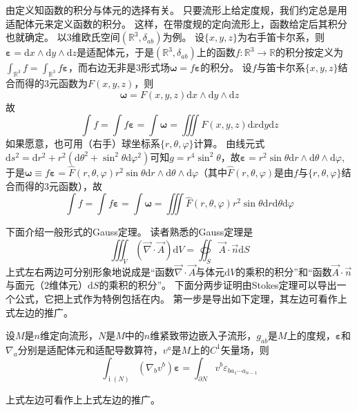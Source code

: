 由定义知函数的积分与体元的选择有关。
只要流形上给定度规，我们约定总是用适配体元来定义函数的积分。
这样，在带度规的定向流形上，函数给定后其积分也就确定。
以$3$维欧氏空间$(\mathbb{R}^3, \delta_{ab})$为例。
设$\{x, y, z\}$为右手笛卡尔系，则$\bm\varepsilon = \mathrm{d}x \wedge \mathrm{d}y \wedge \mathrm{d}z$是适配体元，于是$(\mathbb{R}^3, \delta_{ab})$上的函数$f \colon \mathbb{R}^3 \to \mathbb{R}$的积分按定义为$\displaystyle\int_{\mathbb{R}^3}f = \int_{\mathbb{R}^3}f\bm\varepsilon$，而右边无非是$3$形式场$\bm\omega = f\bm\varepsilon$的积分。
设$f$与笛卡尔系$\{x, y, z\}$结合而得的$3$元函数为$F(x, y, z)$，则
$$\bm\omega = F(x, y, z)\mathrm{d}x\wedge\mathrm{d}y\wedge\mathrm{d}z$$
故
$$\int f = \int f\bm\varepsilon = \int \bm\omega = \iiint F(x, y, z) \mathrm{d}x\mathrm{d}y\mathrm{d}z$$
如果愿意，也可用（右手）球坐标系$\{r, \theta, \varphi\}$计算。
由线元式$\mathrm{d}s^2 = \mathrm{d}r^2 + r^2(\mathrm{d}\theta^2 + \sin^2\theta\mathrm{d}\varphi^2)$可知$g = r^4\sin^2\theta$，故$\bm\varepsilon = r^2\sin\theta\mathrm{d}r\wedge\mathrm{d}\theta\wedge\mathrm{d}\varphi$,于是$\bm\omega \equiv f\bm\varepsilon = \hat{F}(r, \theta, \varphi)r^2\sin\theta\mathrm{d}r \wedge\mathrm{d}\theta\wedge\mathrm{d}\varphi$（其中$\hat{F}(r, \theta, \varphi)$是由$f$与$\{r, \theta, \varphi\}$结合而得的$3$元函数），故
$$\int f = \int f\bm\varepsilon = \int\bm\omega = \iiint\hat{F}(r, \theta, \varphi)r^2\sin\theta\mathrm{d}r\mathrm{d}\theta\mathrm{d}\varphi$$

下面介绍一般形式的Gauss定理。
读者熟悉的Gauss定理是
$$\iiint_V (\vec{\nabla}\cdot\vec{A})\mathrm{d}V = \oiint_S\vec{A}\cdot\vec{n}\mathrm{d}S$$
上式左右两边可分别形象地说成是``函数$\vec\nabla \cdot \vec A$与体元$\mathrm{d}V$的乘积的积分''和``函数$\vec A \cdot \vec n$与面元（$2$维体元）$\mathrm{d}S$的乘积的积分''。
下面分两步证明由Stokes定理可以导出一个公式，它把上式作为特例包括在内。
第一步是导出如下定理，其左边可看作上式左边的推广。

\begin{theorem}
    设$M$是$n$维定向流形，$N$是$M$中的$n$维紧致带边嵌入子流形，$g_{ab}$是$M$上的度规，$\bm\varepsilon$和$\nabla_a$分别是适配体元和适配导数算符，$v^a$是$M$上的$C^1$矢量场，则
    $$\int_{\operatorname{i}(N)}(\nabla_bv^b)\bm\varepsilon = \int_{\partial N}v^b\varepsilon_{b a_1 \cdots a_{n - 1}}$$
\end{theorem}

\begin{note}
    上式左边可看作上上式左边的推广。
\end{note}

